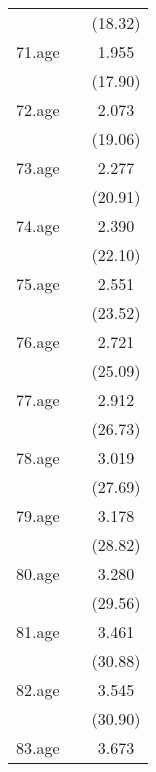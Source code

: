 {\begin{tabular}{l*{2}{c}}
            &                     &     (18.32)         \\
[1em]
71.age      &                     &       1.955\sym{***}\\
            &                     &     (17.90)         \\
[1em]
72.age      &                     &       2.073\sym{***}\\
            &                     &     (19.06)         \\
[1em]
73.age      &                     &       2.277\sym{***}\\
            &                     &     (20.91)         \\
[1em]
74.age      &                     &       2.390\sym{***}\\
            &                     &     (22.10)         \\
[1em]
75.age      &                     &       2.551\sym{***}\\
            &                     &     (23.52)         \\
[1em]
76.age      &                     &       2.721\sym{***}\\
            &                     &     (25.09)         \\
[1em]
77.age      &                     &       2.912\sym{***}\\
            &                     &     (26.73)         \\
[1em]
78.age      &                     &       3.019\sym{***}\\
            &                     &     (27.69)         \\
[1em]
79.age      &                     &       3.178\sym{***}\\
            &                     &     (28.82)         \\
[1em]
80.age      &                     &       3.280\sym{***}\\
            &                     &     (29.56)         \\
[1em]
81.age      &                     &       3.461\sym{***}\\
            &                     &     (30.88)         \\
[1em]
82.age      &                     &       3.545\sym{***}\\
            &                     &     (30.90)         \\
[1em]
83.age      &                     &       3.673\sym{***}\\

\end{tabular}}
